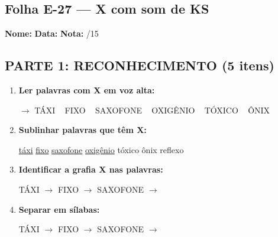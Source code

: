 \subsection{Folha E-27 --- X com som de KS}
\begin{exercicio}



\noindent\textbf{Nome:} \underline{\hspace{3.2cm}} \quad \textbf{Data:} \underline{\hspace{1.6cm}} \quad \textbf{Nota:} \underline{\hspace{0.9cm}}/15


\subsection*{PARTE 1: RECONHECIMENTO (5 itens)}

\begin{enumerate}

  \item \textbf{Ler palavras com X em voz alta:}
  \begin{center}
  $\rightarrow$ TÁXI ~ FIXO ~ SAXOFONE ~ OXIGÊNIO ~ TÓXICO ~ ÔNIX
  \end{center}

  \item \textbf{Sublinhar palavras que têm X:}

\begin{center}
  \uline{táxi} \quad \uline{fixo} \quad \uline{saxofone} \quad \uline{oxigênio} \quad tóxico \quad ônix \quad reflexo
\end{center}

  \item \textbf{Identificar a grafia X nas palavras:}
  \begin{center}
  TÁXI $\rightarrow$ \underline{\hspace{1cm}} \quad FIXO $\rightarrow$ \underline{\hspace{1cm}} \quad SAXOFONE $\rightarrow$ \underline{\hspace{1cm}}
  \end{center}

  \item \textbf{Separar em sílabas:}
  \begin{center}
  TÁXI $\rightarrow$ \underline{\hspace{1.2cm}} \quad FIXO $\rightarrow$ \underline{\hspace{1.2cm}} \quad SAXOFONE $\rightarrow$ \underline{\hspace{1.2cm}}
  \end{center}


\end{enumerate}
\end{exercicio}

